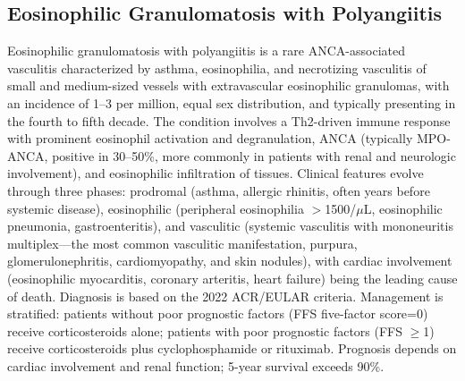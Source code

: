 \subsection{Eosinophilic Granulomatosis with Polyangiitis}
\label{sec:Eosinophilic Granulomatosis with Polyangiitis (EGPA)}
Eosinophilic granulomatosis with polyangiitis is a rare ANCA-associated vasculitis characterized by asthma, eosinophilia, and necrotizing vasculitis of small and medium-sized vessels with extravascular eosinophilic granulomas, with an incidence of 1--3 per million, equal sex distribution, and typically presenting in the fourth to fifth decade. The condition involves a Th2-driven immune response with prominent eosinophil activation and degranulation, ANCA (typically MPO-ANCA, positive in 30--50\%, more commonly in patients with renal and neurologic involvement), and eosinophilic infiltration of tissues. Clinical features evolve through three phases: prodromal (asthma, allergic rhinitis, often years before systemic disease), eosinophilic (peripheral eosinophilia $>$1500/$\mu$L, eosinophilic pneumonia, gastroenteritis), and vasculitic (systemic vasculitis with mononeuritis multiplex---the most common vasculitic manifestation, purpura, glomerulonephritis, cardiomyopathy, and skin nodules), with cardiac involvement (eosinophilic myocarditis, coronary arteritis, heart failure) being the leading cause of death. Diagnosis is based on the 2022 ACR/EULAR criteria. Management is stratified: patients without poor prognostic factors (FFS five-factor score=0) receive corticosteroids alone; patients with poor prognostic factors (FFS $\geq$1) receive corticosteroids plus cyclophosphamide or rituximab. Prognosis depends on cardiac involvement and renal function; 5-year survival exceeds 90\%.

